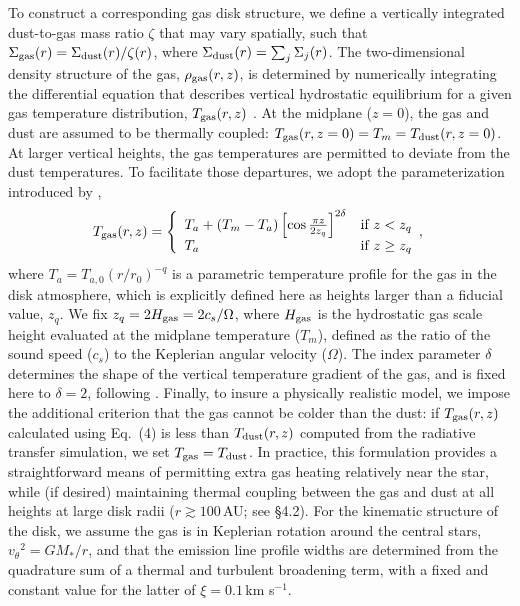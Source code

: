 {To construct a corresponding gas disk structure, we define a vertically 
integrated dust-to-gas mass ratio $\zeta$ that may vary spatially, such that 
$\Sigma_{\rm gas}(r) = \Sigma_{\rm dust}(r)/\zeta(r)$, where $\Sigma_{\rm 
dust}(r) = \sum_j \Sigma_j(r)$.  The two-dimensional density structure of the 
gas, $\rho_{\rm gas}(r, z)$, is determined by numerically integrating the 
differential equation that describes vertical hydrostatic equilibrium for a 
given gas temperature distribution, $T_{\rm gas}(r, z)$ \citep[see][their 
Eq.~5]{andrews12}.  At the midplane ($z = 0$), the gas and dust are assumed to 
be thermally coupled: $T_{\rm gas}(r, z = 0) = T_{m} = T_{\rm dust}(r, z = 
0)$.  At larger vertical heights, the gas temperatures are permitted to deviate 
from the dust temperatures.  To facilitate those departures, we adopt the 
parameterization introduced by \citet{dartois03},
\begin{equation}
 T_{\rm gas}(r, z) = \left\{
\begin{array}{ll}
T_a + \left(T_m - T_a\right) \left[\cos{\frac{\pi z}{2 z_q}}\right]^{2\delta} & \mbox{if $z < z_q$} \\
T_a & \mbox{if $z \ge z_q$} 
\end{array},
\right. 
\end{equation}
where $T_a = T_{a,0} (r/r_0)^{-q}$ is a parametric temperature profile for the
gas in the disk atmosphere, which is explicitly defined here as heights larger
than a fiducial value, $z_q$.  We fix $z_q = 2 H_{\rm gas} = 2 c_s/\Omega$,
where $H_{\rm gas}$ is the hydrostatic gas scale height evaluated at the
midplane temperature ($T_m$), defined as the ratio of the sound speed ($c_s$)
to the Keplerian angular velocity ($\Omega$).  The index parameter $\delta$
determines the shape of the vertical temperature gradient of the gas, and is 
fixed here to $\delta = 2$, following \citet{dartois03}.  Finally, to insure a 
physically realistic model, we impose the additional criterion that the gas 
cannot be colder than the dust: if $T_{\rm gas}(r, z)$ calculated using Eq.~(4) 
is less than $T_{\rm dust}(r, z)$ computed from the radiative transfer 
simulation, we set $T_{\rm gas} = T_{\rm dust}$.  In practice, this formulation
provides a straightforward means of permitting extra gas heating relatively 
near the star, while (if desired) maintaining thermal coupling between the gas
and dust at all heights at large disk radii ($r \gtrsim 100$\,AU; see \S 4.2).
For the kinematic structure of the disk, we assume the gas is in Keplerian
rotation around the central stars, 
${v_{\theta}}^2=GM_\ast/r$, 
and that the emission line profile widths are determined from the quadrature sum
of a thermal and turbulent broadening term, with a fixed and constant value for 
the latter of $\xi = 0.1$\,km s$^{-1}$.

}
